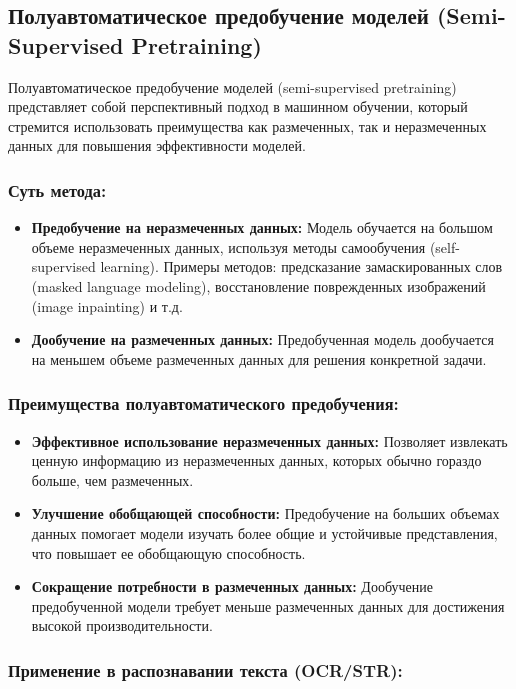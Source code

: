 \subsection{Полуавтоматическое предобучение моделей (Semi-Supervised Pretraining)}

Полуавтоматическое предобучение моделей (semi-supervised pretraining) представляет собой перспективный подход в машинном обучении, который стремится использовать преимущества как размеченных, так и неразмеченных данных для повышения эффективности моделей. 

\subsubsection{Суть метода:}
\begin{itemize}
    \item \textbf{Предобучение на неразмеченных данных:} Модель обучается на большом объеме неразмеченных данных, используя методы самообучения (self-supervised learning). 
    Примеры методов:  предсказание замаскированных слов (masked language modeling), восстановление поврежденных изображений (image inpainting) и т.д.
    \item \textbf{Дообучение на размеченных данных:} Предобученная модель дообучается на меньшем объеме размеченных данных для решения конкретной задачи.
\end{itemize}

\subsubsection{Преимущества полуавтоматического предобучения:}

\begin{itemize}
    \item \textbf{Эффективное использование неразмеченных данных:} Позволяет извлекать ценную информацию из неразмеченных данных, которых обычно гораздо больше, чем размеченных.
    \item \textbf{Улучшение обобщающей способности:} Предобучение на больших объемах данных помогает модели изучать более общие и устойчивые представления, что повышает ее обобщающую способность.
    \item \textbf{Сокращение потребности в размеченных данных:} Дообучение предобученной модели требует меньше размеченных данных для достижения высокой производительности.
\end{itemize}

\subsubsection{Применение в распознавании текста (OCR/STR):}

